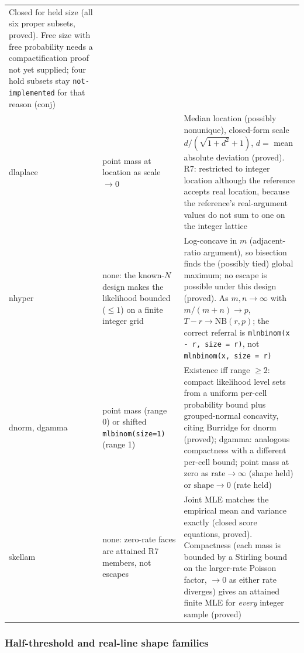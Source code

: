 \documentclass[11pt]{article}
\newcommand{\code}[1]{\texttt{#1}}
\theoremstyle{plain}
\theoremstyle{definition}
\theoremstyle{remark}
\begin{document}
\begin{center}
\begin{tabular}{@{}l p{4.2cm} p{8.2cm}@{}}
  Closed for held size (all six proper subsets, proved). Free size with
  free probability needs a compactification proof not yet supplied; four
  hold subsets stay \code{not-implemented} for that reason (conj) \\
dlaplace & point mass at location as scale $\to0$ &
  Median location (possibly nonunique), closed-form scale
  $d/(\sqrt{1+d^2}+1)$, $d=$ mean absolute deviation (proved). R7: restricted
  to integer location although the reference accepts real location, because
  the reference's real-argument values do not sum to one on the integer
  lattice \\
nhyper & none: the known-$N$ design makes the likelihood bounded ($\le1$)
  on a finite integer grid &
  Log-concave in $m$ (adjacent-ratio argument), so bisection finds the
  (possibly tied) global maximum; no escape is possible under this design
  (proved). As $m,n\to\infty$ with $m/(m+n)\to p$, $T-r\to\mathrm{NB}(r,p)$;
  the correct referral is \code{mlnbinom(x - r, size = r)}, not
  \code{mlnbinom(x, size = r)} \cite{berrymielke1998} \\
dnorm, dgamma & point mass (range 0) or shifted \code{mlbinom(size=1)}
  (range 1) &
  Existence iff range $\ge2$: compact likelihood level sets from a uniform
  per-cell probability bound plus grouped-normal concavity, citing
  Burridge \cite{burridge1981} for dnorm (proved); dgamma: analogous
  compactness with a different per-cell bound; point mass at zero as
  $\mathrm{rate}\to\infty$ (shape held) or $\mathrm{shape}\to0$ (rate held) \\
skellam & none: zero-rate faces are attained R7 members, not escapes &
  Joint MLE matches the empirical mean and variance exactly (closed score
  equations, proved). Compactness (each mass is bounded by a Stirling bound
  on the larger-rate Poisson factor, $\to0$ as either rate diverges) gives
  an attained finite MLE for \emph{every} integer sample (proved) \\
\bottomrule
\end{tabular}
\end{center}

\subsubsection*{Half-threshold and real-line shape families}
\end{document}
